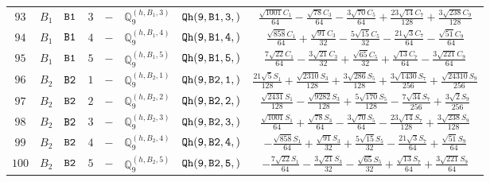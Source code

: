 \documentclass[fleqn,8pt]{jsarticle}
\begin{document}
\begin{table}[ht!]
\begin{center}
\begin{tabular}{cccccccc}
$ 93 $ & $ B_{1} $ & $ {\tt B1} $ & $ 3 $ & $ - $ & $ \mathbb{Q}_{9}^{(h,B_{1},3)} $ & $ {\tt Qh(9,B1,3,)} $ & $ \frac{\sqrt{1001} C_{1}}{64} - \frac{\sqrt{78} C_{3}}{64} - \frac{3 \sqrt{70} C_{5}}{64} + \frac{23 \sqrt{14} C_{7}}{128} + \frac{3 \sqrt{238} C_{9}}{128} $ \\
$ 94 $ & $ B_{1} $ & $ {\tt B1} $ & $ 4 $ & $ - $ & $ \mathbb{Q}_{9}^{(h,B_{1},4)} $ & $ {\tt Qh(9,B1,4,)} $ & $ \frac{\sqrt{858} C_{1}}{64} + \frac{\sqrt{91} C_{3}}{32} - \frac{5 \sqrt{15} C_{5}}{32} - \frac{21 \sqrt{3} C_{7}}{64} - \frac{\sqrt{51} C_{9}}{64} $ \\
$ 95 $ & $ B_{1} $ & $ {\tt B1} $ & $ 5 $ & $ - $ & $ \mathbb{Q}_{9}^{(h,B_{1},5)} $ & $ {\tt Qh(9,B1,5,)} $ & $ \frac{7 \sqrt{22} C_{1}}{64} - \frac{3 \sqrt{21} C_{3}}{32} + \frac{\sqrt{65} C_{5}}{32} + \frac{\sqrt{13} C_{7}}{64} - \frac{3 \sqrt{221} C_{9}}{64} $ \\
$ 96 $ & $ B_{2} $ & $ {\tt B2} $ & $ 1 $ & $ - $ & $ \mathbb{Q}_{9}^{(h,B_{2},1)} $ & $ {\tt Qh(9,B2,1,)} $ & $ \frac{21 \sqrt{5} S_{1}}{128} + \frac{\sqrt{2310} S_{3}}{128} + \frac{3 \sqrt{286} S_{5}}{128} + \frac{3 \sqrt{1430} S_{7}}{256} + \frac{\sqrt{24310} S_{9}}{256} $ \\
$ 97 $ & $ B_{2} $ & $ {\tt B2} $ & $ 2 $ & $ - $ & $ \mathbb{Q}_{9}^{(h,B_{2},2)} $ & $ {\tt Qh(9,B2,2,)} $ & $ \frac{\sqrt{2431} S_{1}}{128} - \frac{\sqrt{9282} S_{3}}{128} + \frac{5 \sqrt{170} S_{5}}{128} - \frac{7 \sqrt{34} S_{7}}{256} + \frac{3 \sqrt{2} S_{9}}{256} $ \\
$ 98 $ & $ B_{2} $ & $ {\tt B2} $ & $ 3 $ & $ - $ & $ \mathbb{Q}_{9}^{(h,B_{2},3)} $ & $ {\tt Qh(9,B2,3,)} $ & $ \frac{\sqrt{1001} S_{1}}{64} + \frac{\sqrt{78} S_{3}}{64} - \frac{3 \sqrt{70} S_{5}}{64} - \frac{23 \sqrt{14} S_{7}}{128} + \frac{3 \sqrt{238} S_{9}}{128} $ \\
$ 99 $ & $ B_{2} $ & $ {\tt B2} $ & $ 4 $ & $ - $ & $ \mathbb{Q}_{9}^{(h,B_{2},4)} $ & $ {\tt Qh(9,B2,4,)} $ & $ - \frac{\sqrt{858} S_{1}}{64} + \frac{\sqrt{91} S_{3}}{32} + \frac{5 \sqrt{15} S_{5}}{32} - \frac{21 \sqrt{3} S_{7}}{64} + \frac{\sqrt{51} S_{9}}{64} $ \\
$ 100 $ & $ B_{2} $ & $ {\tt B2} $ & $ 5 $ & $ - $ & $ \mathbb{Q}_{9}^{(h,B_{2},5)} $ & $ {\tt Qh(9,B2,5,)} $ & $ - \frac{7 \sqrt{22} S_{1}}{64} - \frac{3 \sqrt{21} S_{3}}{32} - \frac{\sqrt{65} S_{5}}{32} + \frac{\sqrt{13} S_{7}}{64} + \frac{3 \sqrt{221} S_{9}}{64} $ \\
 \hline \hline
\end{tabular}
\end{center}
\end{table}
\end{document}
